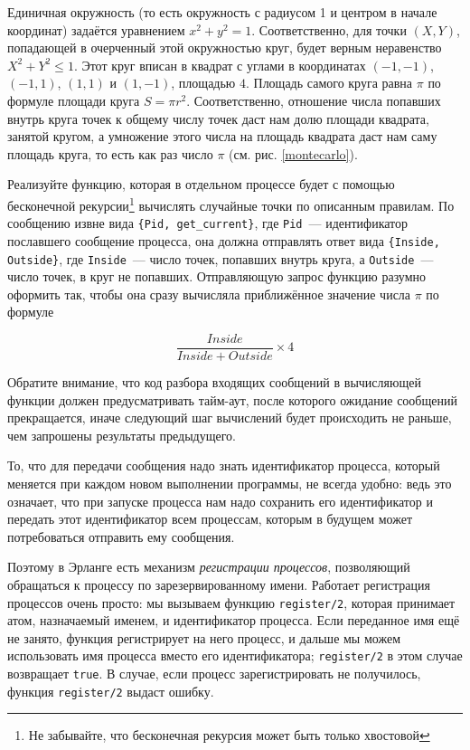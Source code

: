 \documentclass[
  paper=a4,
  fontsize=14pt,
  openany,
  appendixprefix=true
]{scrbook}
\begin{document}
\begin{problem}
Единичная окружность (то есть окружность с радиусом 1 и центром в начале координат) задаётся уравнением $x^2 + y^2 = 1$. Соответственно, для точки $(X, Y)$, попадающей в очерченный этой окружностью круг, будет верным неравенство $X^2 + Y^2 \leqslant 1$. Этот круг вписан в квадрат с углами в координатах $(-1, -1)$, $(-1, 1)$, $(1, 1)$ и $(1, -1)$, площадью $4$. Площадь самого круга равна $\pi$ по формуле площади круга $S = \pi r^2$. Соответственно, отношение числа попавших внутрь круга точек к общему числу точек даст нам долю площади квадрата, занятой кругом, а умножение этого числа на площадь квадрата даст нам саму площадь круга, то есть как раз число $\pi$ (см. рис. \ref{montecarlo}).

Реализуйте функцию, которая в отдельном процессе будет с помощью бесконечной рекурсии\footnote{Не забывайте, что бесконечная рекурсия может быть только хвостовой}  вычислять случайные точки по описанным правилам. По сообщению извне вида \lstinline!{Pid, get_current}!, где \lstinline{Pid}~--- идентификатор пославшего сообщение процесса, она должна отправлять ответ вида \lstinline!{Inside, Outside}!, где \lstinline{Inside}~--- число точек, попавших внутрь круга, а \lstinline{Outside}~--- число точек, в круг не попавших. Отправляющую запрос функцию разумно оформить так, чтобы она сразу вычисляла приближённое значение числа $\pi$ по формуле

$$\frac{Inside}{Inside + Outside} \times 4$$

Обратите внимание, что код разбора входящих сообщений в вычисляющей функции должен предусматривать тайм-аут, после которого ожидание сообщений прекращается, иначе следующий шаг вычислений будет происходить не раньше, чем запрошены результаты предыдущего.

\end{problem}

То, что для передачи сообщения надо знать идентификатор процесса, который меняется при каждом новом выполнении программы, не всегда удобно: ведь это означает, что при запуске процесса нам надо сохранить его идентификатор и передать этот идентификатор всем процессам, которым в будущем может потребоваться отправить ему сообщения.

Поэтому в Эрланге есть механизм {\em регистрации процессов}, позволяющий обращаться к процессу по зарезервированному имени. Работает регистрация процессов очень просто: мы вызываем функцию \lstinline{register/2}, которая принимает атом, назначаемый именем, и идентификатор процесса. Если переданное имя ещё не занято, функция регистрирует на него процесс, и дальше мы можем использовать имя процесса вместо его идентификатора; \lstinline{register/2} в этом случае возвращает \lstinline{true}. В случае, если процесс зарегистрировать не получилось, функция \lstinline{register/2} выдаст ошибку.
\end{document}
